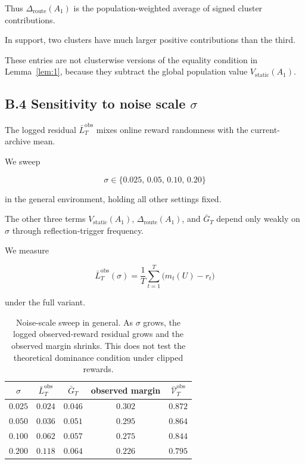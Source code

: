 \documentclass{article} %
\begin{document}
Thus \(\Delta_{\mathrm{route}}(A_1)\) is the population-weighted average of
signed cluster contributions.

In support, two clusters have much larger positive contributions than the
third.

These entries are not clusterwise versions of the equality condition in
Lemma~\ref{lem:1}, because they subtract the global population value
\(V_{\mathrm{static}}(A_1)\).

\subsection{B.4 Sensitivity to noise scale $\sigma$}

\label{app:sigma-sweep}

The logged residual \(\bar L_T^{\mathrm{obs}}\) mixes online reward randomness
with the current-archive mean.

We sweep

\begin{equation}
\label{eq:app-sigma-grid}
\sigma \in \{0.025,\, 0.05,\, 0.10,\, 0.20\}
\end{equation}

in the general environment, holding all other settings fixed.

The other three terms $V_{\mathrm{static}}(A_1)$, $\Delta_{\mathrm{route}}(A_1)$, and $\bar{G}_T$ depend only weakly on $\sigma$ through reflection-trigger frequency.

We measure

\begin{equation}
\label{eq:app-LT-of-sigma}
\bar L_T^{\mathrm{obs}}(\sigma)
=
\frac{1}{T}\sum_{t=1}^{T}\bigl(m_t(U)-r_t\bigr)
\end{equation}

under the full variant.

\begin{table}[h]
\centering
\small
\begin{tabular}{ccccc}
\toprule
$\sigma$ & $\bar L_T^{\mathrm{obs}}$ & $\bar G_T$ & observed margin & $\bar{\mathcal V}_T^{\mathrm{obs}}$ \\
\midrule
$0.025$ & $0.024$ & $0.046$ & $0.302$ & $0.872$ \\
$0.050$ & $0.036$ & $0.051$ & $0.295$ & $0.864$ \\
$0.100$ & $0.062$ & $0.057$ & $0.275$ & $0.844$ \\
$0.200$ & $0.118$ & $0.064$ & $0.226$ & $0.795$ \\
\bottomrule
\end{tabular}
\caption{Noise-scale sweep in general. As \(\sigma\) grows, the logged
observed-reward residual grows and the observed margin shrinks. This does not
test the theoretical dominance condition under clipped rewards.}
\label{tab:app-sigma-sweep}
\end{table}
\end{document}
